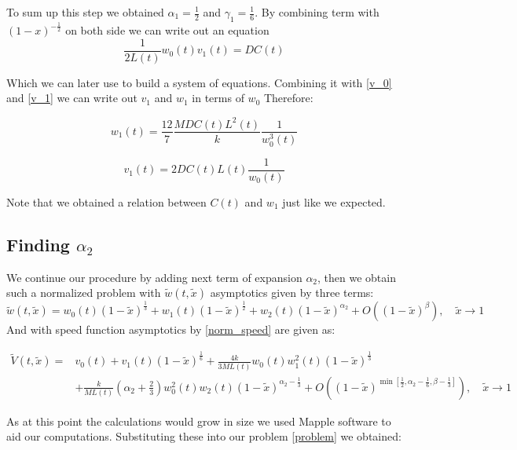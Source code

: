 To sum up this step we obtained $\alpha_{1}=\frac{1}{2}$ and $\gamma_{1}=\frac{1}{6}$. By combining term with $(1-x)^{-\frac{1}{2}}$ on both side we can write out an equation 
\begin{equation}
\frac{1}{2L(t)}w_{0}(t)v_{1}(t)=DC(t)\label{r_1}
\end{equation}

Which we can later use to build a system of equations. Combining it with \eqref{v_0} and \eqref{v_1} we can write out $v_1$ and $w_1$ in terms of $w_0$ Therefore:

\begin{equation}
w_{1}(t)=\frac{12}{7}\frac{MDC(t)L^2(t)}{k}\frac{1}{w_{0}^{3}(t)}\label{w_1}
\end{equation}

\begin{equation}
v_1(t)=2DC(t)L(t)\frac{1}{w_0(t)}\label{v_1}
\end{equation}

Note that we obtained a relation between $C(t)$ and $w_{1}$ just like we expected.

\subsection{Finding $\alpha_{2}$}

We continue our procedure by adding next term of expansion $\alpha_{2}$, then we obtain such a normalized problem with $\tilde{w}(t,\tilde{x})$ asymptotics given by three terms: 
\begin{equation}
\tilde{w}(t,\tilde{x})=w_{0}(t)(1-\tilde{x})^{\frac{1}{3}}+w_{1}(t)(1-\tilde{x})^{\frac{1}{2}}+w_{2}(t)(1-\tilde{x})^{\alpha_{2}}+O\left((1-\tilde{x})^{\beta}\right),\quad\tilde{x}\to1\label{w_2}
\end{equation}
And with speed function asymptotics by \eqref{norm_speed} are given as:

\begin{align}
\tilde V(t,\tilde x)=
&v_0(t)+v_1(t)(1-\tilde{x})^{\frac{1}{6}}+\frac{4k}{3ML(t)}w_{0}(t)w_{1}^{2}(t)(1-\tilde{x})^{\frac{1}{3}}
\\
&+\frac{k}{ML(t)}\left(\alpha_{2}+\frac{2}{3}\right)w_{0}^{2}(t)w_{2}(t)(1-\tilde{x})^{\alpha_{2}-\frac{1}{3}}+O\left((1-\tilde{x})^{\min[\frac{1}{2},\alpha_{2}-\frac{1}{6},\beta-\frac{1}{3}]}\right),\quad\tilde x \rightarrow 1 \label{v_3_asym}
\end{align}

As at this point the calculations would grow in size we used Mapple software to aid our computations. Substituting these into our problem \eqref{problem} we obtained:


